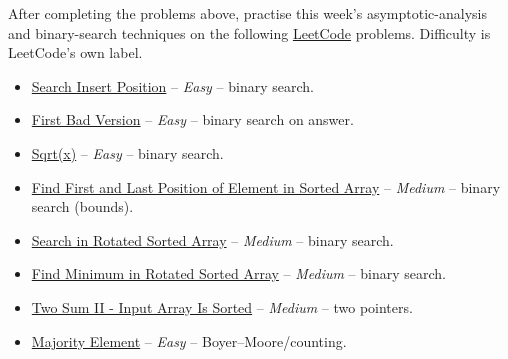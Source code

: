 \documentclass[11pt]{article}
\begin{document}
After completing the problems above, practise this week's asymptotic-analysis and
binary-search techniques on the following \href{https://leetcode.com}{LeetCode} problems.
Difficulty is LeetCode's own label.

\begin{itemize}
  \item \href{https://leetcode.com/problems/search-insert-position/}{Search Insert Position} -- \emph{Easy} -- binary search.
  \item \href{https://leetcode.com/problems/first-bad-version/}{First Bad Version} -- \emph{Easy} -- binary search on answer.
  \item \href{https://leetcode.com/problems/sqrtx/}{Sqrt(x)} -- \emph{Easy} -- binary search.
  \item \href{https://leetcode.com/problems/find-first-and-last-position-of-element-in-sorted-array/}{Find First and Last Position of Element in Sorted Array} -- \emph{Medium} -- binary search (bounds).
  \item \href{https://leetcode.com/problems/search-in-rotated-sorted-array/}{Search in Rotated Sorted Array} -- \emph{Medium} -- binary search.
  \item \href{https://leetcode.com/problems/find-minimum-in-rotated-sorted-array/}{Find Minimum in Rotated Sorted Array} -- \emph{Medium} -- binary search.
  \item \href{https://leetcode.com/problems/two-sum-ii-input-array-is-sorted/}{Two Sum II - Input Array Is Sorted} -- \emph{Medium} -- two pointers.
  \item \href{https://leetcode.com/problems/majority-element/}{Majority Element} -- \emph{Easy} -- Boyer--Moore/counting.
\end{itemize}
\end{document}
